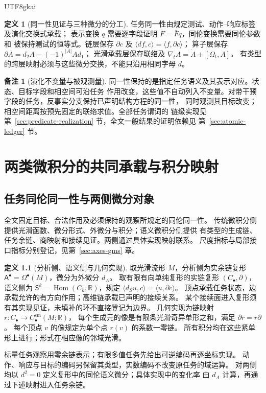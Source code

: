 \documentclass[12pt]{report}
\theoremstyle{definition}
\newtheorem{definition}{定义}[chapter]
\newtheorem{remark}{备注}[chapter]
\newcommand{\RR}{\mathbb R}
\newcommand{\Hom}{\operatorname{Hom}}
\begin{document}
\begin{CJK*}{UTF8}{gkai}
\begin{definition}[同一性见证与三种微分的分工]
\label{def:identity-witness}
任务同一性由规定测试、动作--响应标签及演化交换式承载；
表示变换 \(q\) 需要逐字段证明 \(F=\bar Fq\)，同伦变换需要同伦参数和
被保持测试的恒等式。链层保存 \(\partial c\) 及
\(\langle d f,c\rangle=\langle f,\partial c\rangle\)；
算子层保存 \(\partial A=d_2A-(-1)^{|A|}Ad_1\)；
光滑承载层保存联络及
\(\nabla_t A=\dot A+[\Omega_t,A]\)。
有类型的跨层映射必须与这些微分交换，不能只沿用相同字母 \(d\)。
\end{definition}

\begin{remark}[演化不变量与被观测量]
同一性保持的是指定任务语义及其表示对应。状态、目标字段和相空间可沿任务
作用改变，这些值不自动列入不变量。对带干预字段的任务，反事实分支保持已声明结构方程的同一性，
同时观测其目标改变；相空间距离按预先固定的联络求值。全部任务谓词的
链级实现见第~\ref{sec:predicate-realization} 节，全文一般结果的证明依赖见
第~\ref{sec:atomic-ledger} 节。
\end{remark}

\chapter{两类微积分的共同承载与积分映射}
\label{sec:comparison-carriers}
\section{任务同伦同一性与两侧微分对象}
全文固定目标、合法作用及必须保持的观察所规定的同伦同一性。
传统微积分侧提供光滑函数、微分形式、外微分与积分；语义微积分侧提供
有类型的生成链、任务余链、商映射和接续见证。两侧通过具体实现映射联系。
尺度指标与局部接口指标分别登记，见第~\ref{sec:axes-gms} 章。

\begin{definition}[分析侧、语义侧与几何实现]
\label{def:comparison-data}
取光滑流形 \(M\)，分析侧为实余链复形
\(\mathsf A^\bullet=\Omega^\bullet(M)\)，微分为外微分 \(d_A\)。
取有限有向单纯复形的实链复形 \((C_\bullet,\partial)\)，语义侧为
\(\mathsf S^k=\Hom(C_k,\RR)\)，规定
\(\langle d_Su,c\rangle=\langle u,\partial c\rangle\)。
顶点承载任务状态，边承载允许的有方向作用；高维链承载已声明的接续关系。
某个接续面进入复形须有其实现见证，未填补的环不直接登记为边界。
几何实现为链映射 \(r:C_\bullet\to C^{\mathrm{sm}}_\bullet(M;\RR)\)，
每个生成元的像是有限条光滑奇异单形之和，满足 \(\partial r=r\partial\)。
每个顶点 \(v\) 的像规定为单个点 \(r(v)\) 的系数一零链。
所有积分均在这些紧单形上进行；形式在相应像的邻域光滑。
\end{definition}
标量任务观察用零余链表示；有限多值任务先给出可逆编码再逐坐标实现。
动作、响应与目标的编码另保留其类型，实数编码不改变原任务的域运算。
对两侧均以 \(d^2=0\) 定义复形中的同伦语义微分；具体实现中的变化率
由 \(d_A\) 计算，再通过下述映射进入任务余链。


\end{CJK*}
\end{document}
